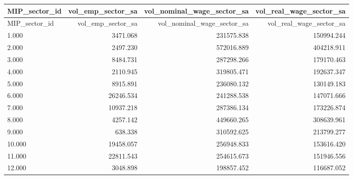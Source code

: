 \begin{longtable}{lrrr}
\hline
MIP\_sector\_id & vol\_emp\_sector\_sa & vol\_nominal\_wage\_sector\_sa & vol\_real\_wage\_sector\_sa \\ 
\hline\endfirsthead
\hline
MIP\_sector\_id & vol\_emp\_sector\_sa & vol\_nominal\_wage\_sector\_sa & vol\_real\_wage\_sector\_sa \\ 
\hline\endhead
1.000 & 3471.068 & 231575.838 & 150994.244 \\ 
2.000 & 2497.230 & 572016.889 & 404218.911 \\ 
3.000 & 8484.731 & 287298.266 & 179170.463 \\ 
4.000 & 2110.945 & 319805.471 & 192637.347 \\ 
5.000 & 8915.891 & 236080.132 & 130149.183 \\ 
6.000 & 26246.534 & 241288.538 & 147071.666 \\ 
7.000 & 10937.218 & 287386.134 & 173226.874 \\ 
8.000 & 4257.142 & 449660.265 & 308639.961 \\ 
9.000 & 638.338 & 310592.625 & 213799.277 \\ 
10.000 & 19458.057 & 256948.833 & 153616.420 \\ 
11.000 & 22811.543 & 254615.673 & 151946.556 \\ 
12.000 & 3048.898 & 198857.452 & 116687.052 \\ 
\hline
\end{longtable}
